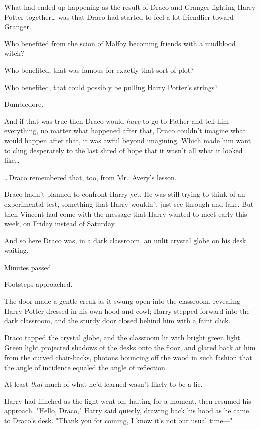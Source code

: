 What had ended up happening as the result of Draco and Granger fighting Harry 
Potter together{\ldots} was that Draco had started to feel a lot friendlier 
toward Granger.

Who benefited from the scion of Malfoy becoming friends with a mudblood witch?

Who benefited, that was famous for exactly that sort of plot?

Who benefited, that could possibly be pulling Harry Potter's strings?

Dumbledore.

And if that was true then Draco would \emph{have} to go to Father and tell him 
everything, no matter what happened after that, Draco couldn't imagine what 
would happen after that, it was awful beyond imagining. Which made him want to 
cling desperately to the last shred of hope that it wasn't all what it looked 
like{\ldots}

{\ldots}Draco remembered that, too, from Mr.~Avery's lesson.

Draco hadn't planned to confront Harry yet. He was still trying to think of an 
experimental test, something that Harry wouldn't just see through and fake. But 
then Vincent had come with the message that Harry wanted to meet early this 
week, on Friday instead of Saturday.

And so here Draco was, in a dark classroom, an unlit crystal globe on his desk, 
waiting.

Minutes passed.

Footsteps approached.

The door made a gentle creak as it swung open into the classroom, revealing 
Harry Potter dressed in his own hood and cowl; Harry stepped forward into the 
dark classroom, and the sturdy door closed behind him with a faint click.

Draco tapped the crystal globe, and the classroom lit with bright green light. 
Green light projected shadows of the desks onto the floor, and glared back at 
him from the curved chair-backs, photons bouncing off the wood in such fashion 
that the angle of incidence equaled the angle of reflection.

At least \emph{that} much of what he'd learned wasn't likely to be a lie.

Harry had flinched as the light went on, halting for a moment, then resumed his 
approach. "Hello, Draco," Harry said quietly, drawing back his hood as he came 
to Draco's desk. "Thank you for coming, I know it's not our usual time---"

